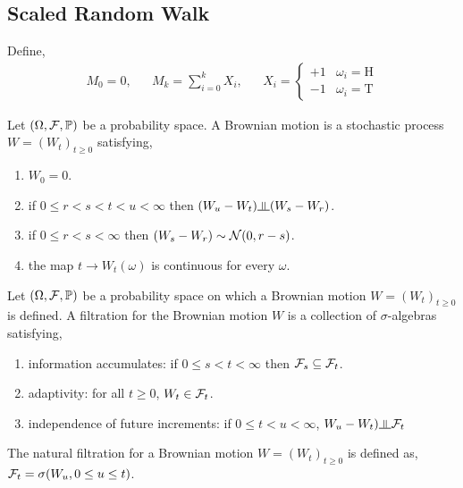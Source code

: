 \documentclass[12pt]{article}
\begin{document}
\subsection{Scaled Random Walk}
Define,
\begin{align*}
    M_0 = 0, &&
    M_k = \sum_{i=0}^{k} X_i, &&
    X_i = \begin{cases}
        +1 & \omega_i = \text{H} \\
        -1 & \omega_i = \text{T}
    \end{cases}
\end{align*}

\begin{definition}
Let \( (\Omega, \mathcal{F}, \mathbb{P}) \) be a probability space. A Brownian motion is a stochastic process \( W = (W_t)_{t\geq 0} \) satisfying,
\begin{enumerate}[nolistsep]
    \item \( W_0 = 0 \).
    \item if \( 0\leq r < s< t< u<\infty \) then \( (W_u-W_t) \indep (W_s-W_r) \).
    \item if \( 0\leq r < s <\infty \) then \( (W_s-W_r)\sim \mathcal{N}(0,r-s) \).
    \item the map \( t\to W_t(\omega) \) is continuous for every \( \omega \).
\end{enumerate}
\end{definition}

\begin{definition}
Let \( (\Omega, \mathcal{F}, \mathbb{P}) \) be a probability space on which a Brownian motion \( W = (W_t)_{t\geq 0} \) is defined. A filtration for the Brownian motion \( W \) is a collection of \( \sigma \)-algebras satisfying,
\begin{enumerate}[nolistsep]
    \item information accumulates: if \( 0\leq s<t<\infty \) then \( \mathcal{F}_s \subseteq \mathcal{F}_t \).
    \item adaptivity: for all \( t\geq 0 \), \( W_t\in\mathcal{F}_t \).
    \item independence of future increments: if \( 0\leq t < u <\infty \), \( W_u-W_t)\indep \cF_t \)
\end{enumerate}
\end{definition}

\begin{definition}
The natural filtration for a Brownian motion \( W = (W_t)_{t\geq 0} \) is defined as, \( \mathcal{F}_t = \sigma(W_u, 0\leq u \leq t) \).
\end{definition}
\end{document}
